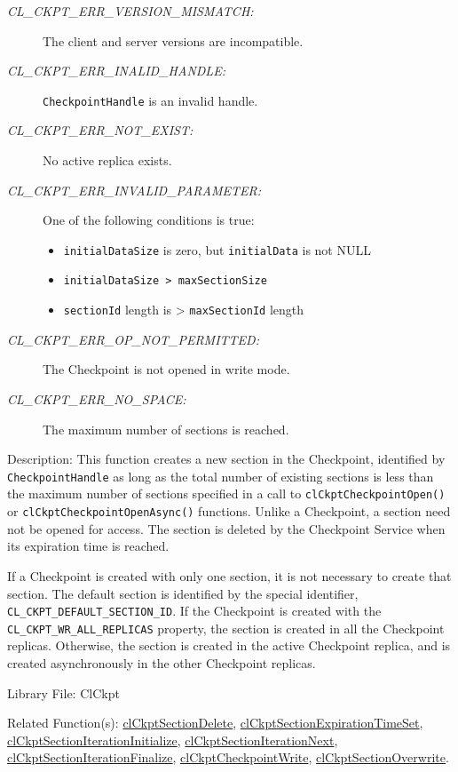 \begin{flushleft}
\begin{Desc}
\begin{description}
\item[{\em CL\_\-CKPT\_\-ERR\_\-VERSION\_\-MISMATCH:}]The client and server versions are incompatible.
\item[{\em CL\_\-CKPT\_\-ERR\_\-INALID\_\-HANDLE:}]{\tt{CheckpointHandle}} is an invalid handle.
\item[{\em CL\_\-CKPT\_\-ERR\_\-NOT\_\-EXIST:}] No active replica exists.
\item[{\em CL\_\-CKPT\_\-ERR\_\-INVALID\_\-PARAMETER:}]One of the following conditions is true:
\begin{itemize}
\item
{\tt{initialDataSize}} is zero, but {\tt{initialData}} is not NULL
\item
{\tt{initialDataSize > maxSectionSize}}
\item
{\tt{sectionId}} length is > {\tt{maxSectionId}} length
\end{itemize}
\item[{\em CL\_\-CKPT\_\-ERR\_\-OP\_\-NOT\_\-PERMITTED:}] The Checkpoint is not opened in write mode.
\item[{\em CL\_\-CKPT\_\-ERR\_\-NO\_\-SPACE:}] The maximum number of sections is reached.
\end{description}
\end{Desc}
\begin{Desc}
\item[Description:]This function creates a new section in the Checkpoint, identified by {\tt{Checkpoint\-Handle}} as long as the total number of existing 
sections is less than the maximum number of sections specified in a call to {\tt{clCkptCheckpointOpen()}} or {\tt{clCkptCheckpointOpenAsync()}} functions. 
Unlike a Checkpoint, a section need not be opened for access. The section is deleted by the Checkpoint Service when its expiration time is reached. \par
 \par
 If a Checkpoint is created with only one section, it is not necessary to create that section. The default section is identified by the special 
 identifier, {\tt{CL\_\-CKPT\_\-DEFAULT\_\-SECTION\_\-ID}}. If the Checkpoint is created with the {\tt{CL\_\-CKPT\_\-WR\_\-ALL\_\-REPLICAS}} property, the
 section is created in all the Checkpoint replicas. Otherwise, the section is created in the active 
 Checkpoint replica, and is created asynchronously in the other Checkpoint replicas.\end{Desc}
\begin{Desc}
\item[Library File:]Cl\-Ckpt\end{Desc}
\begin{Desc}
\item[Related Function(s):]\hyperlink{pageckpt111}{cl\-Ckpt\-Section\-Delete}, \hyperlink{pageckpt112}{cl\-Ckpt\-Section\-Expiration\-Time\-Set},
\hyperlink{pageckpt113}{cl\-Ckpt\-Section\-Iteration\-Initialize}, \hyperlink{pageckpt114}{cl\-Ckpt\-Section\-Iteration\-Next}, 
\hyperlink{pageckpt115}{cl\-Ckpt\-Section\-Iteration\-Finalize}, \hyperlink{pageckpt116}{cl\-Ckpt\-Checkpoint\-Write},
\hyperlink{pageckpt117}{cl\-Ckpt\-Section\-Overwrite}. \end{Desc}
\newpage



\end{flushleft}
